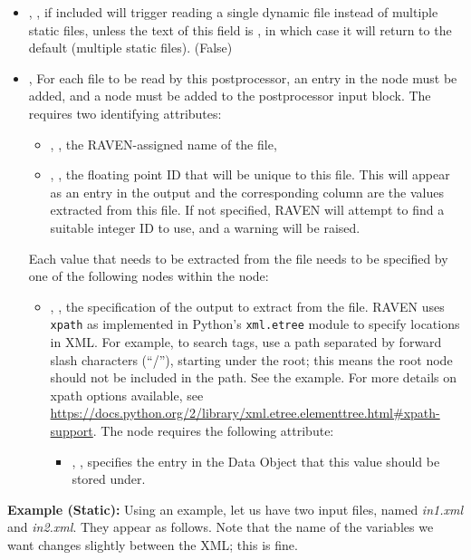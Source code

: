 \begin{itemize}
  \item {}, , if included will trigger reading a single dynamic
  file instead of multiple static files, unless the text of this field is , in which case it
  will return to the default (multiple static files).  (False)
  \item {}, 
  For each file to be read by this postprocessor, an entry in the  node must be added, and a
   node must be added to the postprocessor input block.  The  requires two
  identifying attributes:
  \begin{itemize}
    \item {}, , the RAVEN-assigned name of the file,
    \item {}, , the floating point ID that will be unique to this
      file.  This will appear as an entry in the output  and the corresponding column are
      the values extracted from this file.  If not specified, RAVEN will attempt to find a suitable integer ID
      to use, and a warning will be raised.
  \end{itemize}
  Each value that needs to be extracted from the file needs to be specified by one of the following
   nodes within the  node:
  \begin{itemize}
    \item {}, ,
           the specification of the output to extract from the file.
           RAVEN uses \texttt{xpath} as implemented in Python's \texttt{xml.etree} module to specify locations
           in XML.  For example, to search tags, use a path
           separated by forward slash characters (``/''), starting under the root; this means the root node should not
           be included in the path. See the example.  For more details on xpath options available, see
           \url{https://docs.python.org/2/library/xml.etree.elementtree.html#xpath-support}.
           The  node requires the following attribute:
      \begin{itemize}
        \item {}, , specifies the entry in the Data Object that
          this value should be stored under.
      \end{itemize}

  \end{itemize}
\end{itemize}
\textbf{Example (Static):}
Using an example, let us have two input files, named \emph{in1.xml} and \emph{in2.xml}.  They appear as
follows.  Note that the name of the variables we want changes slightly between the XML; this is fine.

